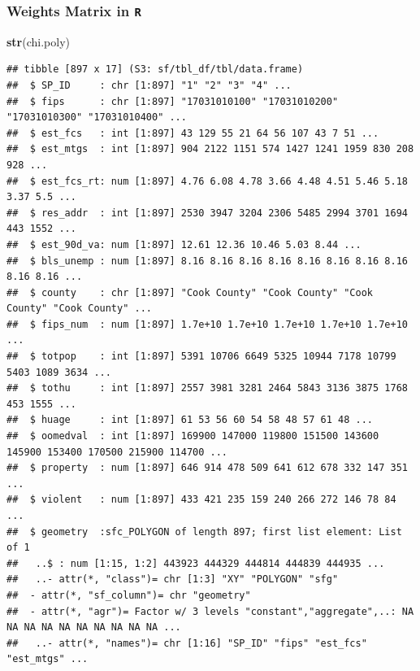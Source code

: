 \documentclass[
  shownotes,
  xcolor={svgnames},
  hyperref={colorlinks,citecolor=DarkBlue,linkcolor=DarkRed,urlcolor=DarkBlue}
   , aspectratio=169]{beamer}
\newenvironment{Shaded}{\begin{snugshade}}{\end{snugshade}}
\newcommand{\KeywordTok}[1]{\textcolor[rgb]{0.13,0.29,0.53}{\textbf{#1}}}
\newcommand{\NormalTok}[1]{#1}
\begin{document}
\begin{frame}[fragile]
\frametitle{Weights Matrix in \texttt{R}}

\begin{scriptsize}
\begin{Shaded}
\begin{Highlighting}[]
\KeywordTok{str}\NormalTok{(chi.poly)}
\end{Highlighting}
\end{Shaded}
\end{scriptsize}
\begin{tiny}


\begin{verbatim}
## tibble [897 x 17] (S3: sf/tbl_df/tbl/data.frame)
##  $ SP_ID     : chr [1:897] "1" "2" "3" "4" ...
##  $ fips      : chr [1:897] "17031010100" "17031010200" "17031010300" "17031010400" ...
##  $ est_fcs   : int [1:897] 43 129 55 21 64 56 107 43 7 51 ...
##  $ est_mtgs  : int [1:897] 904 2122 1151 574 1427 1241 1959 830 208 928 ...
##  $ est_fcs_rt: num [1:897] 4.76 6.08 4.78 3.66 4.48 4.51 5.46 5.18 3.37 5.5 ...
##  $ res_addr  : int [1:897] 2530 3947 3204 2306 5485 2994 3701 1694 443 1552 ...
##  $ est_90d_va: num [1:897] 12.61 12.36 10.46 5.03 8.44 ...
##  $ bls_unemp : num [1:897] 8.16 8.16 8.16 8.16 8.16 8.16 8.16 8.16 8.16 8.16 ...
##  $ county    : chr [1:897] "Cook County" "Cook County" "Cook County" "Cook County" ...
##  $ fips_num  : num [1:897] 1.7e+10 1.7e+10 1.7e+10 1.7e+10 1.7e+10 ...
##  $ totpop    : int [1:897] 5391 10706 6649 5325 10944 7178 10799 5403 1089 3634 ...
##  $ tothu     : int [1:897] 2557 3981 3281 2464 5843 3136 3875 1768 453 1555 ...
##  $ huage     : int [1:897] 61 53 56 60 54 58 48 57 61 48 ...
##  $ oomedval  : int [1:897] 169900 147000 119800 151500 143600 145900 153400 170500 215900 114700 ...
##  $ property  : num [1:897] 646 914 478 509 641 612 678 332 147 351 ...
##  $ violent   : num [1:897] 433 421 235 159 240 266 272 146 78 84 ...
##  $ geometry  :sfc_POLYGON of length 897; first list element: List of 1
##   ..$ : num [1:15, 1:2] 443923 444329 444814 444839 444935 ...
##   ..- attr(*, "class")= chr [1:3] "XY" "POLYGON" "sfg"
##  - attr(*, "sf_column")= chr "geometry"
##  - attr(*, "agr")= Factor w/ 3 levels "constant","aggregate",..: NA NA NA NA NA NA NA NA NA NA ...
##   ..- attr(*, "names")= chr [1:16] "SP_ID" "fips" "est_fcs" "est_mtgs" ...
\end{verbatim}
\end{tiny}

\end{frame}
\end{document}
